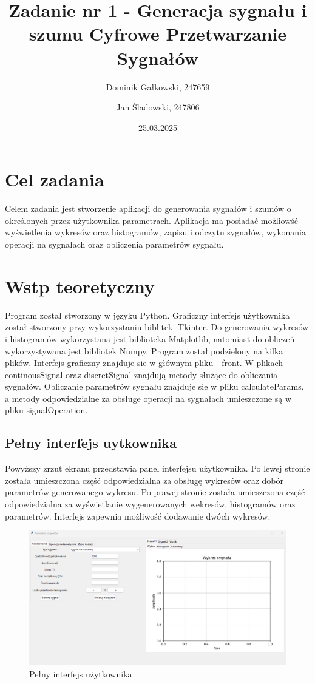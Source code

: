 \documentclass{article}
\title{{\bf Zadanie nr 1 - Generacja sygnału i szumu}\linebreak
Cyfrowe Przetwarzanie Sygnałów}
\author{Dominik Gałkowski, 247659 \and Jan Śladowski, 247806}
\date{25.03.2025}
\begin{document}
\clearpage\maketitle
\thispagestyle{empty}
\newpage
\setcounter{page}{1}
\section{Cel zadania}

Celem zadania jest stworzenie aplikacji do generowania sygnałów i szumów o określonych
przez użytkownika parametrach. Aplikacja ma posiadać możliowść wyświetlenia wykresów oraz histogramów,
zapisu i odczytu sygnałów, wykonania operacji na sygnałach oraz obliczenia parametrów sygnału.

\section{Wstp teoretyczny}

Program został stworzony w języku Python. Graficzny interfejs użytkownika został stworzony
przy wykorzystaniu bibliteki Tkinter. Do generowania wykresów i histogramów wykorzystana jest biblioteka Matplotlib,
natomiast do obliczeń wykorzystywana jest bibliotek Numpy. Program został podzielony na kilka plików.
Interfejs graficzny znajduje sie w głównym pliku - front. W plikach continousSignal oraz discretSignal znajdują
metody służące do obliczania sygnałów. Obliczanie parametrów sygnału znajduje sie w pliku calculateParams, a
metody odpowiedzialne za obsługe operacji na sygnałach umieszczone są w pliku signalOperation.

\subsection{Pełny interfejs uytkownika} 




Powyższy zrzut ekranu przedstawia panel interfejsu użytkownika. Po lewej stronie
            została umieszczona część odpowiedzialna za obsługę wykresów oraz dobór parametrów
            generowanego wykresu. Po prawej stronie została umieszczona część odpowiedzialna za
            wyświetlanie wygenerowanych wekresów, histogramów oraz parametrów. Interfejs zapewnia
            możliwość dodawanie dwóch wykresów.
\FloatBarrier
\begin{figure}[h!]
    \centering
    \includegraphics[width=\textwidth]{img/glowny.png}
    \caption{Pełny interfejs użytkownika}
\end{figure}
\end{document}
